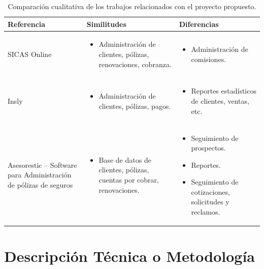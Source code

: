 \begin{table}[ht!]
  \begin{tabular}{p{} p{} p{}}
    \toprule
    \textbf{{Referencia}} & \textbf{{Similitudes}} & \textbf{{Diferencias}} \\
    \toprule
    SICAS Online &
    \begin{itemize}[leftmargin=*]
        \item Administración de clientes, pólizas, renovaciones, cobranza.
    \end{itemize} &
    \begin{itemize}[leftmargin=*]
        \item Administración de comisiones.
    \end{itemize} \\
    \midrule
    Insly &
    \begin{itemize}[leftmargin=*]
        \item Administración de clientes, pólizas, pagos.
    \end{itemize} &
    \begin{itemize}[leftmargin=*]
        \item Reportes estadísticos de clientes, ventas, etc.
    \end{itemize} \\
\midrule
Asesorestic – Software para Administración de pólizas de seguros &
\begin{itemize}[leftmargin=*]
	\item Base de datos de clientes, pólizas, cuentas por cobrar, renovaciones.
\end{itemize} &
\begin{itemize}[leftmargin=*]
	\item Seguimiento de prospectos.
	\item Reportes.
	\item Seguimiento de cotizaciones, solicitudes y reclamos.
\end{itemize} \\

    \bottomrule
  \end{tabular}
  \caption{Comparación cualitativa de los trabajos relacionados con el proyecto propuesto.}
  \label{table:related}
\end{table}

\section*{Descripción Técnica o Metodología}

